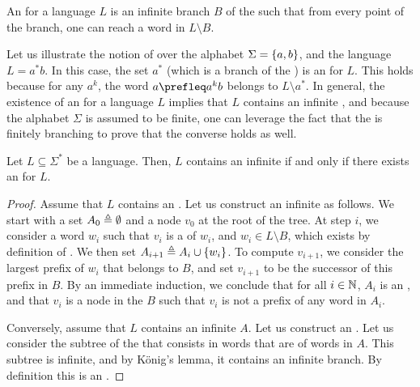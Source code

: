 \begin{definition}
    An  for a language $L$ is an infinite 
    branch $B$ of the  such that from every point of the branch, 
    one can reach a word in $L \setminus B$.
\end{definition}

Let us illustrate the notion of  over the alphabet $\Sigma
= \{ a,b \}$, and the language $L = a^* b$. In this case, the set $a^*$ (which
is a branch of the ) is an  for $L$.
This holds because for any $a^k$, the word $a \prefleq a^kb$ belongs to $L
\setminus a^*$. In general, the existence of an  for a
language $L$ implies that $L$ contains an infinite , and because
the alphabet $\Sigma$ is assumed to be finite, one can leverage the fact that
the  is finitely branching to prove that the converse
holds as well.

\begin{lemma}
    \label{antichain-branches-prefix:lem}
    Let $L \subseteq \Sigma^*$ be a language. Then, $L$ contains an infinite
     if and only if there exists an  for $L$.
\end{lemma}
\begin{proof}
    Assume that $L$ contains an . Let us construct an
    infinite  as follows. We start with a set $A_0 \triangleq
    \emptyset$ and a node $v_0$ at the root of the tree. At step $i$, we
    consider a word $w_i$ such that $v_i$ is a  of $w_i$, and $w_i
    \in L \setminus B$, which exists by definition of .
    We then set $A_{i+1} \triangleq A_i \cup \{ w_i \}$. To compute $v_{i+1}$, we
    consider the largest prefix of $w_i$ that belongs to $B$, and set $v_{i+1}$
    to be the successor of this prefix in $B$. By an immediate induction, we
    conclude that for all $i \in \mathbb{N}$, $A_i$ is an , and that
    $v_i$ is a node in the  $B$ such that $v_i$ is not a
    prefix of any word in $A_i$. 

    Conversely, assume that $L$ contains an infinite  $A$. Let us
    construct an . Let us consider the subtree of the
     that consists in words that are  of
    words in $A$. This subtree is infinite, and by König's lemma, it contains
    an infinite branch. By definition this is an .
\end{proof}

